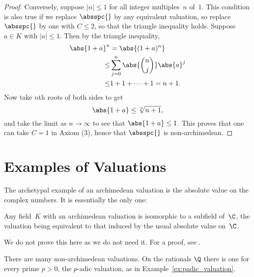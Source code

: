 \documentclass[11pt]{book}
\begin{document}
\begin{ch}
\begin{proof}
Conversely, suppose $|n|\leq 1$ for all integer multiples~$n$ of~$1$.
This condition is also true if we replace $\absspc{}$ by
any equivalent valuation, so replace $\absspc{}$ by
one with $C\leq 2$, so that the triangle inequality holds.
Suppose $a\in K$ with $|a|\leq 1$.  Then
by the triangle inequality,
\begin{align*}
  \abs{1+a}^n &= \abs{(1+a)^n} \\
     \leq& \sum_{j=0}^n \abs{\binom{n}{j}} \abs{a}^j\\
     \leq& 1 + 1 + \cdots + 1 = n+1.
\end{align*}
Now take $n$th roots of both sides to get
$$\abs{1+a} \leq \sqrt[n]{n+1},$$
and take the limit as $n\to \infty$ to see
that $\abs{1+a} \leq 1$.  This proves that one
can take $C=1$ in Axiom (3), hence that $\absspc{}$
is non-archimedean.
\end{proof}

\section{Examples of Valuations}
The archetypal example of an archimedean valuation is the absolute
value on the complex numbers.  It is essentially the only one:
\begin{theorem} Any field~$K$ with
an archimedean valuation is isomorphic to a subfield of~$\C$,
the valuation being equivalent to that induced by the usual
absolute value on~$\C$.
\end{theorem}
We do not prove this here as we do not need it.  For a proof,
see \cite[pg. 45, 67]{artin:ant}.

There are many non-archimedean valuations.  On the rationals $\Q$
there is one for every prime $p>0$, the $p$-adic valuation, as
in Example~\ref{ex:padic_valuation}.


\end{ch}
\end{document}
